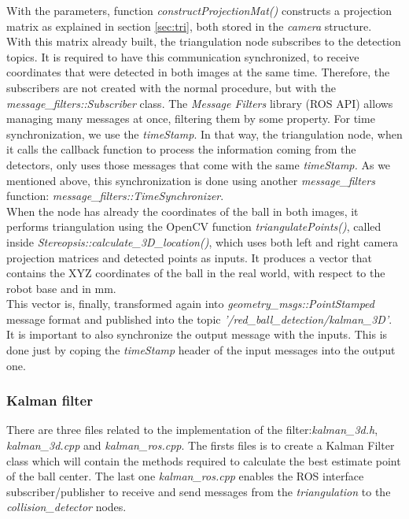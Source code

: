 With the parameters, function \textit{constructProjectionMat()} constructs a projection matrix as explained in section \ref{sec:tri}, both stored in the \textit{camera} structure.\\

With this matrix already built, the triangulation node subscribes to the detection topics. It is required to have this communication synchronized, to receive coordinates that were detected in both images at the same time. Therefore, the subscribers are not created with the normal procedure, but with the \textit{message\_filters::Subscriber} class. The \textit{Message Filters} library (ROS API) allows managing many messages at once, filtering them by some property. For time synchronization, we use the \textit{timeStamp}. In that way, the triangulation node, when it calls the callback function to process the information coming from the detectors, only uses those messages that come with the same \textit{timeStamp.} As we mentioned above, this synchronization is done using another \textit{message\_filters} function: \textit{message\_filters::TimeSynchronizer}. \\

When the node has already the coordinates of the ball in both images, it performs triangulation using the OpenCV function \textit{triangulatePoints()}, called inside \textit{Stereopsis::calculate\_3D\_location()}, which uses both left and right camera projection matrices and detected points as inputs. It produces a vector that contains the XYZ coordinates of the ball in the real world, with respect to the robot base and in mm. \\

This vector is, finally, transformed again into \textit{geometry\_msgs::PointStamped} message format and published into the topic \textit{'/red\_ball\_detection/kalman\_3D'}. It is important to also synchronize the output message with the inputs. This is done just by coping the \textit{timeStamp} header of the input messages into the output one.

\subsubsection{Kalman filter}

There are three files related to the implementation of the filter:\textit{kalman\_3d.h}, \textit{kalman\_3d.cpp} and \textit{kalman\_ros.cpp}. The firsts files is to create a Kalman Filter class which will contain the methods required to calculate the best estimate point of the ball center. The last one \textit{kalman\_ros.cpp} enables the ROS interface subscriber/publisher to receive and send messages from the \textit{triangulation} to the \textit{collision\_detector} nodes.

